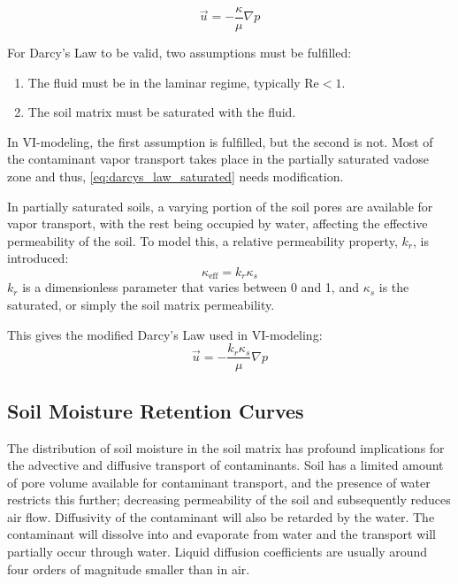 \documentclass[../main.tex]{subfiles}
\begin{document}
\begin{equation}\label{eq:darcys_law_saturated}
  \vec{u} = -\frac{\kappa}{\mu}\nabla p
\end{equation}

For Darcy's Law to be valid, two assumptions must be fulfilled:
\begin{enumerate}
  \item The fluid must be in the laminar regime, typically $\mathrm{Re} < 1$.
  \item The soil matrix must be saturated with the fluid.
\end{enumerate}
In VI-modeling, the first assumption is fulfilled, but the second is not.
Most of the contaminant vapor transport takes place in the partially saturated vadose zone and thus, \eqref{eq:darcys_law_saturated} needs modification.

In partially saturated soils, a varying portion of the soil pores are available for vapor transport, with the rest being occupied by water, affecting the effective permeability of the soil.
To model this, a relative permeability property, $k_r$, is introduced:
\begin{equation}
  \kappa_\mathrm{eff} = k_r \kappa_s
\end{equation}
$k_r$ is a dimensionless parameter that varies between 0 and 1, and $\kappa_s$ is the saturated, or simply the soil matrix permeability.

This gives the modified Darcy's Law used in VI-modeling:
\begin{equation}\label{eq:darcys_law}
  \vec{u} = -\frac{k_r \kappa_s}{\mu}\nabla p
\end{equation}


\subsection{Soil Moisture Retention Curves}

The distribution of soil moisture in the soil matrix has profound implications for the advective and diffusive transport of contaminants.
Soil has a limited amount of pore volume available for contaminant transport, and the presence of water restricts this further; decreasing permeability of the soil and subsequently reduces air flow.
Diffusivity of the contaminant will also be retarded by the water.
The contaminant will dissolve into and evaporate from water and the transport will partially occur through water.
Liquid diffusion coefficients are usually around four orders of magnitude smaller than in air.
\end{document}
